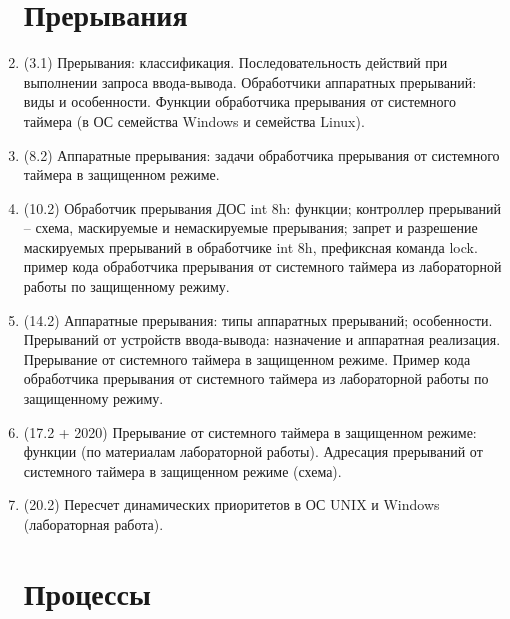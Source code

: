 \documentclass[a4paper,14pt]{extreport}
\begin{document}
\begin{enumerate}
\section{Прерывания}
    \item (3.1) Прерывания: классификация. Последовательность действий при
        выполнении запроса ввода-вывода. Обработчики аппаратных прерываний:
        виды и особенности. Функции обработчика прерывания от
        системного таймера (в ОС семейства Windows и семейства Linux).
    \item (8.2) Аппаратные прерывания: задачи обработчика прерывания от
        системного таймера в защищенном режиме.
    \item (10.2) Обработчик прерывания ДОС int 8h: функции; контроллер
        прерываний -- схема, маскируемые и немаскируемые прерывания; запрет и
        разрешение маскируемых прерываний в обработчике int 8h, префиксная
        команда lock. пример кода обработчика прерывания от системного таймера
        из лабораторной работы по защищенному режиму.
    \item (14.2) Аппаратные прерывания: типы аппаратных прерываний;
        особенности. Прерываний от устройств ввода-вывода: назначение и
        аппаратная реализация. Прерывание от системного таймера в защищенном
        режиме. Пример кода обработчика прерывания от системного таймера
        из лабораторной работы по защищенному режиму.
    \item (17.2 + 2020) Прерывание от системного таймера в защищенном режиме:
        функции (по материалам лабораторной работы). Адресация прерываний от
        системного таймера в защищенном режиме (схема).
    \item (20.2) Пересчет динамических приоритетов в ОС UNIX и Windows
        (лабораторная работа).

\section{Процессы}

\end{enumerate}
\end{document}
